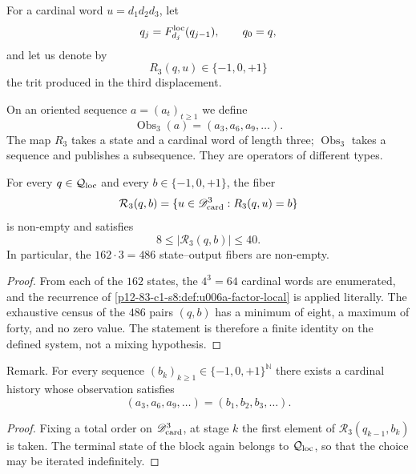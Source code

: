 {For a cardinal word \(u=d_1d_2d_3\), let
\[
 q_j=F_{d_j}^{\rm loc}(q_{j-1}),\qquad q_0=q,
\]
and let us denote by
\[
 R_3(q,u)\in\{-1,0,+1\}
\]
the trit produced in the third displacement.

\begin{definition}
\label{p12-83-c1-s8:def:u006a-obs3}
On an oriented sequence \(a=(a_t)_{t\geq1}\) we define
\[
 \operatorname{Obs}_3(a)=(a_3,a_6,a_9,\ldots).
\]
The map \(R_3\) takes a state and a cardinal word of length three;
\(\operatorname{Obs}_3\) takes a sequence and publishes a subsequence. They are
operators of different types.
\end{definition}

\begin{theorem}
\label{p12-83-c1-s8:thm:u006a-sobreyectividad-r3}
For every \(q\in\mathcal Q_{\rm loc}\) and every
\(b\in\{-1,0,+1\}\), the fiber
\[
 \mathcal R_3(q,b)
 =\{u\in\mathscr D_{\rm card}^3:R_3(q,u)=b\}
\]
is non-empty and satisfies
\[
 \boxed{8\leq |\mathcal R_3(q,b)|\leq40.}
\]
In particular, the \(162\cdot3=486\) state--output fibers are non-empty.
\end{theorem}

\begin{proof}
From each of the \(162\) states, the \(4^3=64\) cardinal words are
enumerated, and the recurrence of
\cref{p12-83-c1-s8:def:u006a-factor-local} is applied literally. The exhaustive census of the \(486\) pairs
\((q,b)\) has a minimum of eight, a maximum of forty, and no zero value. The
statement is therefore a finite identity on the defined system, not
a mixing hypothesis.
\end{proof}

\begin{corollary}
\label{p12-83-c1-s8:cor:u006a-realizacion-sucesion}
Remark. For every sequence
\((b_k)_{k\geq1}\in\{-1,0,+1\}^{\mathbb N}\) there exists a cardinal history
whose observation satisfies
\[
 (a_3,a_6,a_9,\ldots)=(b_1,b_2,b_3,\ldots).
\]
\end{corollary}

\begin{proof}
Fixing a total order on \(\mathscr D_{\rm card}^3\), at stage \(k\) the
first element of \(\mathcal R_3(q_{k-1},b_k)\) is taken. The terminal state
of the block again belongs to \(\mathcal Q_{\rm loc}\), so that the
choice may be iterated indefinitely.
\end{proof}

}
